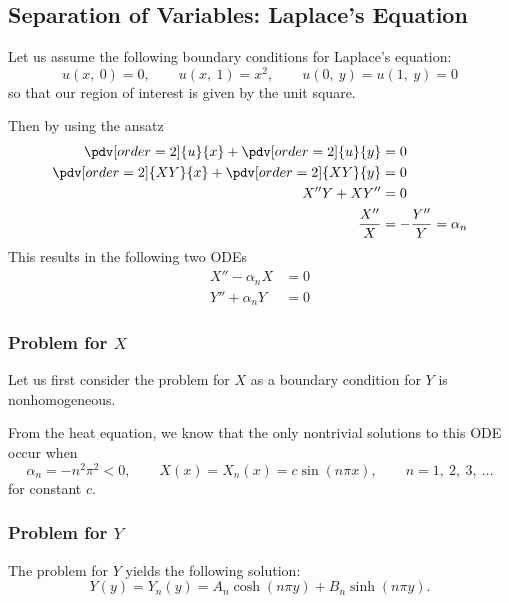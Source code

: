 \documentclass{article}
\begin{document}
\subsection{Separation of Variables: Laplace's Equation}
Let us assume the following boundary conditions for Laplace's equation:
\begin{equation*}
    u\left( x,\: 0 \right) = 0, \quad \quad u\left( x,\: 1 \right) = x^2, \quad \quad u\left( 0,\: y \right) = u\left( 1,\: y \right) = 0
\end{equation*}
so that our region of interest is given by the unit square.

Then by using the ansatz
\begin{align*}
    \pdv[order=2]{u}{x} + \pdv[order=2]{u}{y}   & = 0                          \\
    \pdv[order=2]{XY}{x} + \pdv[order=2]{XY}{y} & = 0                          \\
    X''Y + XY''                                 & = 0                          \\
    \frac{X''}{X}                               & = - \frac{Y''}{Y} = \alpha_n
\end{align*}
This results in the following two ODEs
\begin{align*}
    X'' - \alpha_n X & = 0 \\
    Y'' + \alpha_n Y & = 0
\end{align*}
\subsubsection{Problem for \(X\)}
Let us first consider the problem for \(X\) as a boundary condition for
\(Y\) is nonhomogeneous.

From the heat equation, we know that the only nontrivial solutions to
this ODE occur when
\begin{equation*}
    \alpha_n = - n^2 \pi^2 < 0, \quad \quad X\left( x \right) = X_n\left( x \right) = c \sin{\left( n \pi x \right)}, \quad \quad n = 1,\: 2,\: 3,\: \dots
\end{equation*}
for constant \(c\).
\subsubsection{Problem for \(Y\)}
The problem for \(Y\) yields the following solution:
\begin{equation*}
    Y\left( y \right) = Y_n\left( y \right) = A_n \cosh{\left( n \pi y \right)} + B_n \sinh{\left( n \pi y \right)}.
\end{equation*}
\end{document}
